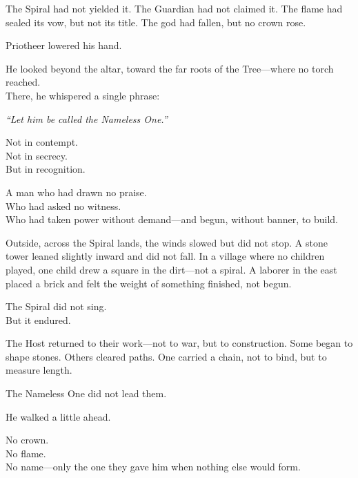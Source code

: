 \documentclass[12pt]{article}
\begin{document}
\vspace{0.5em}
The Spiral had not yielded it. The Guardian had not claimed it. The flame had sealed its vow, but not its title. The god had fallen, but no crown rose.

\vspace{0.5em}
Priotheer lowered his hand.

\vspace{0.5em}
He looked beyond the altar, toward the far roots of the Tree---where no torch reached.\\
There, he whispered a single phrase:

\vspace{0.5em}
\textit{``Let him be called the Nameless One.''}

\vspace{0.5em}
Not in contempt.\\
Not in secrecy.\\
But in recognition.

\vspace{0.5em}
A man who had drawn no praise.\\
Who had asked no witness.\\
Who had taken power without demand---and begun, without banner, to build.

\vspace{0.5em}
Outside, across the Spiral lands, the winds slowed but did not stop. A stone tower leaned slightly inward and did not fall. In a village where no children played, one child drew a square in the dirt---not a spiral. A laborer in the east placed a brick and felt the weight of something finished, not begun.

\vspace{0.5em}
The Spiral did not sing.\\
But it endured.

\vspace{0.5em}
The Host returned to their work---not to war, but to construction. Some began to shape stones. Others cleared paths. One carried a chain, not to bind, but to measure length.

\vspace{0.5em}
The Nameless One did not lead them.

\vspace{0.5em}
He walked a little ahead.

\vspace{0.5em}
No crown.\\
No flame.\\
No name---only the one they gave him when nothing else would form.
\end{document}
